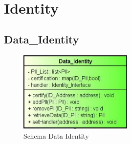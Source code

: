 \section{Identity}
\subsection{Data\_Identity}
\begin{figure}[!h]
	\centering
	\includegraphics[width=0.5\textwidth]{immagini/identityData}
	\caption{Schema Data Identity}
\end{figure}
